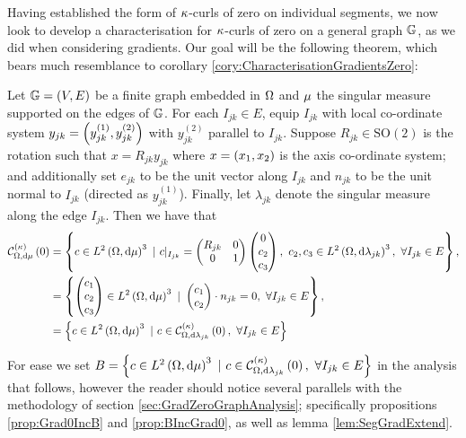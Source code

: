 Having established the form of $\kappa$-curls of zero on individual segments, we now look to develop a characterisation for $\kappa$-curls of zero on a general graph $\mathbb{G}$, as we did when considering gradients.
Our goal will be the following theorem, which bears much resemblance to corollary \ref{cory:CharacterisationGradientsZero}:
\begin{theorem} \label{thm:kCurlZeroGraphChar}
	Let $\mathbb{G}=\left( V,E \right)$ be a finite graph embedded in $\Omega$ and $\mu$ the singular measure supported on the edges of $\mathbb{G}$.
	For each $I_{jk}\in E$, equip $I_{jk}$ with local co-ordinate system $y_{jk} = \left( y_{jk}^{(1)},y_{jk}^{(2)} \right)$ with $y_{jk}^{(2)}$ parallel to $I_{jk}$.
	Suppose $R_{jk}\in\mathrm{SO}(2)$ is the rotation such that $x=R_{jk}y_{jk}$ where $x=\left( x_1,x_2 \right)$ is the axis co-ordinate system; and additionally set $e_{jk}$ to be the unit vector along $I_{jk}$ and $n_{jk}$ to be the unit normal to $I_{jk}$ (directed as $y_{jk}^{(1)}$).
	Finally, let $\lambda_{jk}$ denote the singular measure along the edge $I_{jk}$.
	Then we have that
	\begin{align*}
		\kcurlZero{\ddom}{\ddmes} &= 
		\clbracs{
		c\in\ltwo{\ddom}{\ddmes}^3 \ \vert \
		c\vert_{I_{jk}} = \begin{pmatrix} R_{jk} & 0 \\ 0 & 1 \end{pmatrix} \begin{pmatrix} 0 \\ c_2 \\ c_3 \end{pmatrix}, \ c_2,c_3\in\ltwo{\ddom}{\lambda_{jk}}^3, \ \forall I_{jk}\in E				
		}, \\
		&= \clbracs{
		\begin{pmatrix} c_1 \\ c_2 \\ c_3 \end{pmatrix} \in\ltwo{\ddom}{\ddmes}^3 \ \vert \
		\begin{pmatrix} c_1 \\ c_2 \end{pmatrix} \cdot n_{jk} = 0, \ \forall I_{jk}\in E	
		}, \\				
		&= \clbracs{ c\in\ltwo{\ddom}{\ddmes}^3 \ \vert \ c\in\kcurlZero{\ddom}{\lambda_{jk}}, \ \forall I_{jk}\in E}
	\end{align*}
\end{theorem}
For ease we set $B = \clbracs{ c\in\ltwo{\ddom}{\ddmes}^3 \ \vert \ c\in\kcurlZero{\ddom}{\lambda_{jk}}, \ \forall I_{jk}\in E}$ in the analysis that follows, however the reader should notice several parallels with the methodology of section \ref{sec:GradZeroGraphAnalysis}; specifically propositions \ref{prop:Grad0IncB} and \ref{prop:BIncGrad0}, as well as lemma \ref{lem:SegGradExtend}.
